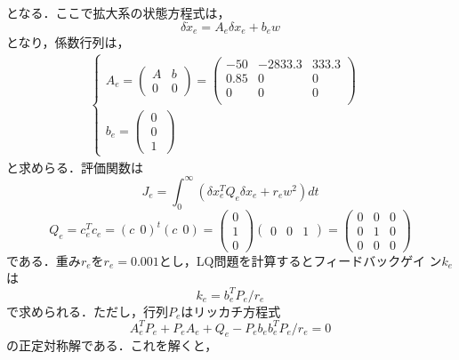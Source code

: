 \documentclass[a4paper,12pt]{jarticle}
\begin{document}
%
となる．ここで拡大系の状態方程式は，
%
\begin{equation}
 \delta \dot{x}_e = A_{e}\delta x_e + b_e w
\end{equation}
%
となり，係数行列は，
%
\begin{eqnarray}
 \begin{cases}
A_e=
  \begin{pmatrix}
   A & b \\
   0 & 0
  \end{pmatrix}
  =
  \begin{pmatrix}
   -50  & -2833.3 & 333.3 \\
   0.85 & 0       & 0   \\
   0    &  0      &   0\\
  \end{pmatrix}
  & \\
  b_e =
  \begin{pmatrix}
  \ 0 \ \\
  \ 0 \ \\
  \ 1 \
  \end{pmatrix}
 \end{cases}
\end{eqnarray}
%
と求めらる．評価関数は
%
\begin{equation}
J_e = \int_{0}^{\infty} (\delta x_e^{T}Q_{e}\delta x_e + r_e w^2 ) dt 
\end{equation}
%
\begin{equation}
 Q_e = c_e^Tc_e = (c \ \ 0)^t(c \ \ 0) =
\begin{pmatrix}
 0 \\
 1 \\
 0
\end{pmatrix}
%
\begin{pmatrix}
 0 & 0 & 1
\end{pmatrix}
%
=
%
\begin{pmatrix}
 0 & 0 & 0 \\
 0 & 1 & 0 \\
 0 & 0 & 0
\end{pmatrix}
\end{equation}
%
である．重み$r_e$を$r_e=0.001$とし，LQ問題を計算するとフィードバックゲイ
ン$k_e$は
%
\begin{equation}
 k_e = b_e^{T}P_e/r_e
\end{equation}
%
で求められる．ただし，行列$P_e$はリッカチ方程式
%
\begin{equation}
 A_e^{T}P_e + P_e A_e + Q_e - P_e b_e b_e^T P_e /r_e = 0
\end{equation}
%
の正定対称解である．これを解くと，
\end{document}

